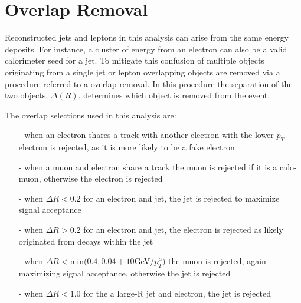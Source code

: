 \section{Overlap Removal}
Reconstructed jets and leptons in this analysis can arise from the same energy deposits. For instance, a cluster of energy from an electron can also be a valid calorimeter seed for a jet. To mitigate this confusion of multiple objects originating from a single jet or lepton overlapping objects are removed via a procedure referred to a overlap removal. In this procedure the separation of the two objects, $\Delta (R) $, determines which object is removed from the event. 

The overlap selections used in this analysis are:

\begin{itemize}
\item[-] when an electron shares a track with another electron with the lower $p_{T}$ electron is rejected, as it is more likely to be a fake electron
\item[-] when a muon and electron share a track the muon is rejected if it is a calo-muon, otherwise the electron is rejected
\item[-] when $\Delta R < 0.2$ for an electron and jet, the jet is rejected to maximize signal acceptance
\item[-] when $\Delta R > 0.2$ for an electron and jet, the electron is rejected as likely originated from decays within the jet
\item[-] when $\Delta R <$min$(0.4, 0.04+10$GeV/$p_{T}^{\mu})$ the muon is rejected, again maximizing signal acceptance, otherwise the jet is rejected
\item[-] when $\Delta R < 1.0$ for the a large-R jet and electron, the jet is rejected

\end{itemize}

